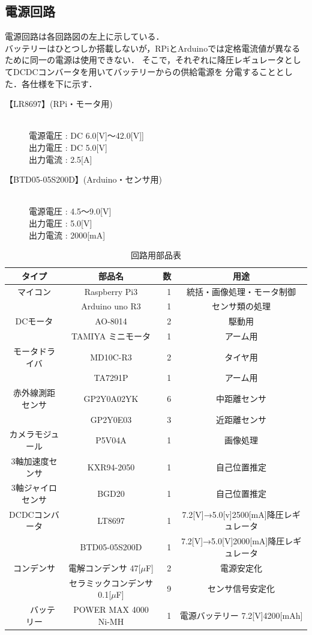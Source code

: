 \subsection{電源回路}
電源回路は各回路図の左上に示している．\\
バッテリーはひとつしか搭載しないが，RPiとArduinoでは定格電流値が異なるために同一の電源は使用できない．
そこで，それぞれに降圧レギュレータとしてDCDCコンバータを用いてバッテリーからの供給電源を
分電することとした．各仕様を下に示す．


\begin{description}
 \item[【LR8697】(RPi・モータ用)] \mbox{} \\
	    電源電圧 : DC 6.0[V]$〜$42.0[V]] \\
	    出力電圧 : DC 5.0[V] \\
	    出力電流 : 2.5[A]
 \item[【BTD05-05S200D】(Arduino・センサ用)] \mbox{} \\
	    電源電圧 : 4.5$〜$9.0[V] \\
	    出力電圧 : 5.0[V] \\
	    出力電流 : 2000[mA]
\end{description}

\begin{table}[hb]
  \centering
  \caption{回路用部品表}
  \begin{tabular}{|c|c|r||c|} \hline
    タイプ & 部品名 & 数 & 用途 \\ \hline \hline
     マイコン & Raspberry Pi3 & 1& 統括・画像処理・モータ制御 \\ \cline{2-4}
   　　& Arduino uno R3& 1 & センサ類の処理 \\ \hline
     DCモータ & AO-8014 & 2 & 駆動用 \\ \cline{2-4}
      & TAMIYA ミニモータ & 1&アーム用  \\ \hline
    モータドライバ& MD10C-R3 & 2& タイヤ用 \\ \cline{2-4}
      &  TA7291P&1 &アーム用 \\ \hline
     赤外線測距センサ& GP2Y0A02YK &6&中距離センサ\\ \cline{2-4}
       &GP2Y0E03&3&近距離センサ \\ \hline
     カメラモジュール&P5V04A&1&画像処理\\ \hline
     3軸加速度センサ&KXR94-2050&1&自己位置推定\\ \hline
     3軸ジャイロセンサ&BGD20&1&自己位置推定\\ \hline
    DCDCコンバータ&LT8697&1& 7.2[V]→5.0[v]2500[mA]降圧レギュレータ\\ \cline{2-4}
       &BTD05-05S200D&1&7.2[V]→5.0[V]2000[mA]降圧レギュレータ\\ \hline
    コンデンサ&電解コンデンサ 47[$\mu$F]&2&電源安定化\\ \cline{2-4}
            &セラミックコンデンサ 0.1[$\mu$F]&9&センサ信号安定化\\ \hline
　　バッテリー&POWER MAX 4000 Ni-MH&1&電源バッテリー 7.2[V]4200[mAh]\\ \hline
                 
  \end{tabular}
  \label{tab:c_parts}
\end{table}

